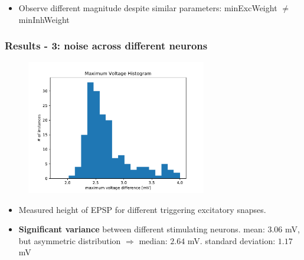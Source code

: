 \documentclass{beamer}
\begin{document}
\begin{frame}
\begin{columns}

	\end{columns}

	\begin{itemize}
		\item Observe different magnitude despite similar parameters: minExcWeight
		$\neq$ minInhWeight
	\end{itemize}
\end{frame}

\begin{frame}
	\frametitle{Results - 3: noise across different neurons}

	\begin{figure}
		\includegraphics[width=0.7\textwidth]{figures/histo_maxVolt.pdf}
	\end{figure}

	\begin{itemize}
		\item Measured height of EPSP for different triggering excitatory snapses.
		 \item \textbf{Significant variance} between different stimulating neurons.
		  mean: $3.06$ mV,  but asymmetric distribution $\Rightarrow$ median: $2.64$ mV.
		 standard deviation: $1.17$ mV
	\end{itemize}
\end{frame}
\end{document}
